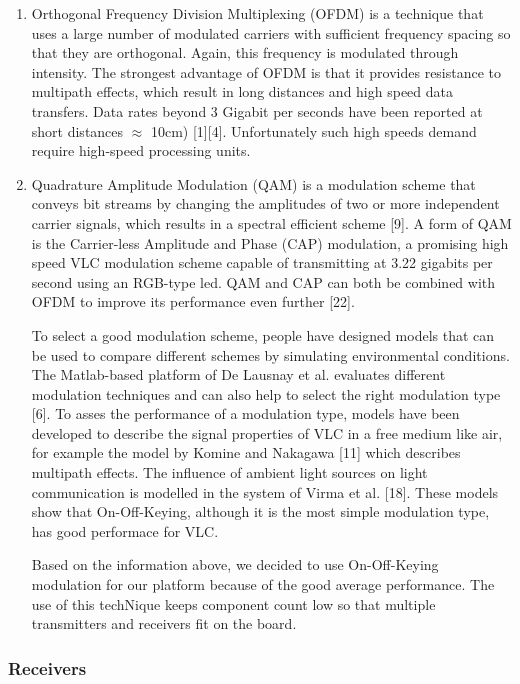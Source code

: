 \begin{enumerate}
\item Orthogonal Frequency Division Multiplexing (OFDM) is a technique that
uses a large number of modulated carriers with sufficient frequency spacing
so that they are orthogonal. Again, this frequency is modulated through intensity.
The strongest advantage of OFDM is that it provides resistance to
multipath effects, which result in long distances and high speed data transfers.
Data rates beyond 3 Gigabit per seconds have been reported at short
distances $\approx$ 10cm) [1][4]. Unfortunately such high speeds demand require
high-speed processing units.

\item  Quadrature Amplitude Modulation (QAM) is a modulation scheme that conveys
bit streams by changing the amplitudes of two or more independent
carrier signals, which results in a spectral efficient scheme [9]. A form of
QAM is the Carrier-less Amplitude and Phase (CAP) modulation, a promising
high speed VLC modulation scheme capable of transmitting at 3.22
gigabits per second using an RGB-type led. QAM and CAP can both
be combined with OFDM to improve its performance even further [22].

To select a good modulation scheme, people have designed models that can
be used to compare different schemes by simulating environmental conditions.
The Matlab-based platform of De Lausnay et al. evaluates different modulation
techniques and can also help to select the right modulation type [6]. To asses
the performance of a modulation type, models have been developed to describe
the signal properties of VLC in a free medium like air, for example the model by
Komine and Nakagawa [11] which describes multipath effects. The influence of
ambient light sources on light communication is modelled in the system of Virma
et al. [18]. These models show that On-Off-Keying, although it is the most simple
modulation type, has good performace for VLC.

Based on the information above, we decided to use On-Off-Keying modulation
for our platform because of the good average performance. The use of this techNique keeps component count low so that multiple transmitters and receivers fit
on the board.

\end{enumerate}

\subsubsection{Receivers}

